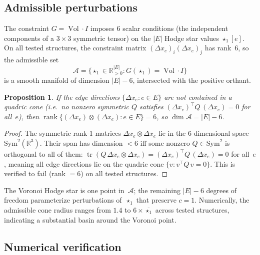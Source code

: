 \documentclass[preprint,12pt]{elsarticle}
\newtheorem{proposition}[theorem]{Proposition}
\DeclareMathOperator{\Vol}{Vol}
\DeclareMathOperator{\tr}{tr}
\DeclareMathOperator{\rank}{rank}
\begin{document}
\subsection{Admissible perturbations}
\label{sec:admissible}

The constraint $G = \Vol \cdot I$ imposes 6 scalar conditions (the
independent components of a $3 \times 3$ symmetric tensor) on the $|E|$
Hodge star values $\star_1[e]$. On all tested structures, the constraint
matrix $(\Delta x_e)_i (\Delta x_e)_j$ has rank~6, so the admissible set
\begin{equation}
  \mathcal{A} = \{ \star_1 \in \mathbb{R}^{|E|}_{>0} :
    G(\star_1) = \Vol \cdot I \}
\end{equation}
is a smooth manifold of dimension $|E| - 6$, intersected with the positive
orthant.

\begin{proposition}
\label{prop:rank6}
If the edge directions $\{\Delta x_e : e \in E\}$ are not contained in a
quadric cone (i.e.\ no nonzero symmetric $Q$ satisfies
$(\Delta x_e)^\top Q\, (\Delta x_e) = 0$ for all~$e$), then
$\rank\{(\Delta x_e) \otimes (\Delta x_e) : e \in E\} = 6$,
so $\dim \mathcal{A} = |E| - 6$.
\end{proposition}

\begin{proof}
The symmetric rank-1 matrices $\Delta x_e \otimes \Delta x_e$ lie in the
6-dimensional space $\mathrm{Sym}^2(\mathbb{R}^3)$. Their span has
dimension $< 6$ iff some nonzero $Q \in \mathrm{Sym}^2$ is orthogonal
to all of them: $\tr(Q\, \Delta x_e \otimes \Delta x_e)
= (\Delta x_e)^\top Q\, (\Delta x_e) = 0$ for all~$e$, meaning all
edge directions lie on the quadric cone $\{v : v^\top Q\, v = 0\}$.
This is verified to fail (rank $= 6$) on all tested structures.
\end{proof}

The Voronoi Hodge star is one point in~$\mathcal{A}$; the remaining
$|E|-6$ degrees of freedom parameterize perturbations of~$\star_1$ that
preserve $c = 1$. Numerically, the admissible cone
radius ranges from $1.4$ to $6 \times \overline{\star_1}$ across tested
structures, indicating a substantial basin around the Voronoi point.

\subsection{Numerical verification}
\label{sec:metric_numerics}
\end{document}
